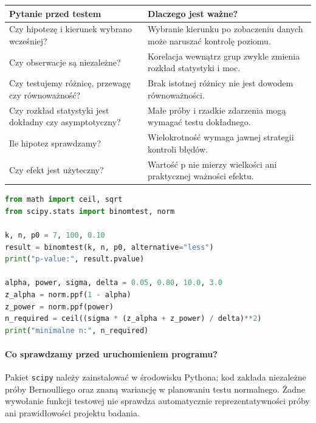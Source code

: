 \begin{center}\small
\begin{tabular}{>{\raggedright\arraybackslash}p{}>{\raggedright\arraybackslash}p{}}
\toprule
\textbf{Pytanie przed testem} & \textbf{Dlaczego jest ważne?}\\
\midrule
Czy hipotezę i kierunek wybrano wcześniej? & Wybranie kierunku po zobaczeniu danych może naruszać kontrolę poziomu.\\
Czy obserwacje są niezależne? & Korelacja wewnątrz grup zwykle zmienia rozkład statystyki i moc.\\
Czy testujemy różnicę, przewagę czy równoważność? & Brak istotnej różnicy nie jest dowodem równoważności.\\
Czy rozkład statystyki jest dokładny czy asymptotyczny? & Małe próby i rzadkie zdarzenia mogą wymagać testu dokładnego.\\
Ile hipotez sprawdzamy? & Wielokrotność wymaga jawnej strategii kontroli błędów.\\
Czy efekt jest użyteczny? & Wartość p nie mierzy wielkości ani praktycznej ważności efektu.\\
\bottomrule
\end{tabular}
\end{center}

\begin{lstlisting}[language=Python,caption={Dokładny test dwumianowy i obliczenie mocy testu normalnego.}]
from math import ceil, sqrt
from scipy.stats import binomtest, norm

k, n, p0 = 7, 100, 0.10
result = binomtest(k, n, p0, alternative="less")
print("p-value:", result.pvalue)

alpha, power, sigma, delta = 0.05, 0.80, 10.0, 3.0
z_alpha = norm.ppf(1 - alpha)
z_power = norm.ppf(power)
n_required = ceil((sigma * (z_alpha + z_power) / delta)**2)
print("minimalne n:", n_required)
\end{lstlisting}

\paragraph{Co sprawdzamy przed uruchomieniem programu?}
Pakiet \texttt{scipy} należy zainstalować w środowisku Pythona;
kod zakłada niezależne próby Bernoulliego oraz znaną wariancję
w planowaniu testu normalnego. Żadne wywołanie funkcji testowej
nie sprawdza automatycznie reprezentatywności próby ani
prawidłowości projektu badania.



